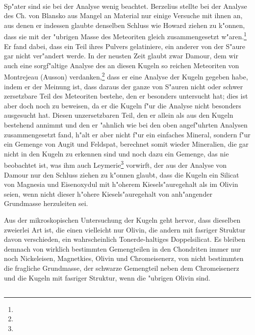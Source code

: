 \documentclass[a4paper, 11pt, oneside]{article}
\begin{document}
\paragraph{}
Sp"ater sind sie bei der Analyse wenig beachtet. Berzelius stellte bei der Analyse des Ch. von Blansko aus Mangel an Material nur einige Versuche mit ihnen an, aus denen er indessen glaubte denselben Schluss wie Howard ziehen zu k"onnen, dass sie mit der "ubrigen Masse des Meteoriten gleich zusammengesetzt w"aren.\footnote{} Er fand dabei, dass ein Teil ihres Pulvers gelatiniere, ein anderer von der S"aure gar nicht ver"andert werde. In der neusten Zeit glaubt zwar Damour, dem wir auch eine sorgf"altige Analyse des an diesen Kugeln so reichen Meteoriten von Montrejeau (Ausson) verdanken,\footnote{} dass er eine Analyse der Kugeln gegeben habe, indem er der Meinung ist, dass daraus der ganze von S"auren nicht oder schwer zersetzbare Teil des Meteoriten bestehe, den er besonders untersucht hat; dies ist aber doch noch zu beweisen, da er die Kugeln f"ur die Analyse nicht besonders ausgesucht hat. Diesen unzersetzbaren Teil, den er allein als aus den Kugeln bestehend annimmt und den er "ahnlich wie bei den oben angef"uhrten Analysen zusammengesetzt fand, h"alt er aber nicht f"ur ein einfaches Mineral, sondern f"ur ein Gemenge von Augit und Feldspat, berechnet somit wieder Mineralien, die gar nicht in den Kugeln zu erkennen sind und noch dazu ein Gemenge, das nie beobachtet ist, was ihm auch Leymerie\footnote{} vorwirft, der aus der Analyse von Damour nur den Schluss ziehen zu k"onnen glaubt, dass die Kugeln ein Silicat von Magnesia und Eisenoxydul mit h"oherem Kiesels"auregehalt als im Olivin seien, wenn nicht dieser h"ohere Kiesels"auregehalt von anh"angender Grundmasse herzuleiten sei.

Aus der mikroskopischen Untersuchung der Kugeln geht hervor, dass dieselben zweierlei Art ist, die einen vielleicht nur Olivin, die andern mit fasriger Struktur davon verschieden, ein wahrscheinlich Tonerde-haltiges Doppelsilicat. Es bleiben demnach von wirklich bestimmten Gemengteilen in den Chondriten immer nur noch Nickeleisen, Magnetkies, Olivin und Chromeisenerz, von nicht bestimmten die fragliche Grundmasse, der schwarze Gemengteil neben dem Chromeisenerz und die Kugeln mit fasriger Struktur, wenn die "ubrigen Olivin sind.
\subsection{}
\end{document}
